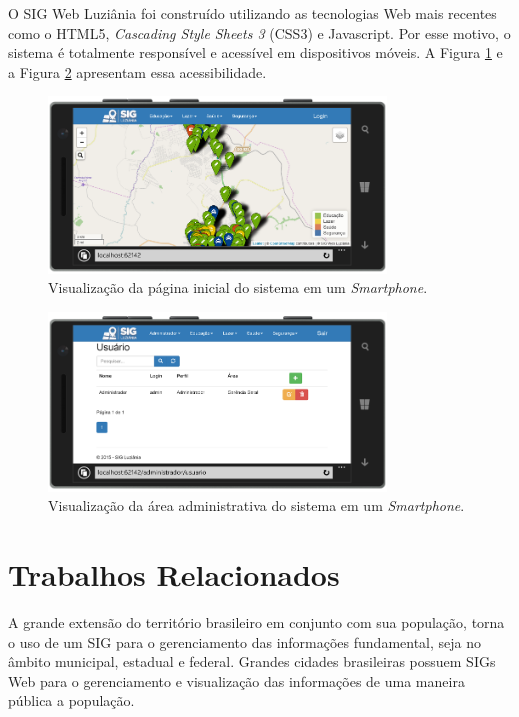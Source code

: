 O SIG Web Luziânia foi construído utilizando as tecnologias Web mais recentes como o HTML5, \textit{Cascading Style Sheets 3} (CSS3) e Javascript. Por esse motivo, o sistema é totalmente responsível e acessível em dispositivos móveis. A Figura \ref{fig:MobileMapa} e a Figura \ref{fig:MobileAdm} apresentam essa acessibilidade.

\begin{figure}[h]
\centering
\includegraphics[width=0.80\textwidth]{./img/cap_IV/28-MobileMapa}
\caption{Visualização da página inicial do sistema em um \textit{Smartphone}.}
\label{fig:MobileMapa}
\end{figure}

\newpage

\begin{figure}[h]
\centering
\includegraphics[width=0.80\textwidth]{./img/cap_IV/29-MobileAdm}
\caption{Visualização da área administrativa do sistema em um \textit{Smartphone}.}
\label{fig:MobileAdm}
\end{figure}

\section{Trabalhos Relacionados}

A grande extensão do território brasileiro em conjunto com sua população, torna o uso de um SIG para o gerenciamento das informações fundamental, seja no âmbito municipal, estadual e federal. Grandes cidades brasileiras possuem SIGs Web para o gerenciamento e visualização das informações de uma maneira pública a população.

